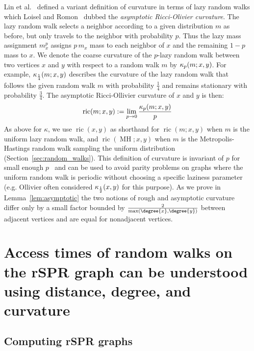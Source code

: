 \documentclass[11pt,onecolumn,conference]{IEEEtran}
\newcommand{\MH}{\operatorname{MH}}
\newcommand{\curvature}[2][]{%
    \ifthenelse{\equal{#1}{}}%
		{\kappa(#2)}%
		{\kappa_{#1}(#2)}%
}
\newcommand{\ric}[1]{
	\operatorname{ric}(#1)%
}
\begin{document}
Lin et al.~\cite{lin2011ricci} defined a variant definition of curvature in terms of lazy random walks which Loisel and Romon~\cite{Loisel2014-hu} dubbed the \emph{asymptotic Ricci-Olivier curvature}.
The lazy random walk selects a neighbor according to a given distribution $m$ as before, but only travels to the neighbor with probability $p$.
Thus the lazy mass assignment $m^p_x$ assigns $p\, m_x$ mass to each neighbor of $x$ and the remaining $1 - p$ mass to $x$.
We denote the coarse curvature of the $p$-lazy random walk between two vertices $x$ and $y$ with respect to a random walk $m$ by $\curvature[p]{m; x,y}$.
For example, $\curvature[\frac{1}{4}]{m; x,y}$ describes the curvature of the lazy random walk that follows the given random walk $m$ with probability $\frac{1}{4}$ and remains stationary with probability $\frac{3}{4}$.
The asymptotic Ricci-Ollivier curvature of $x$ and $y$ is then:
\begin{equation}
\ric{m; x, y} := \lim_{p \rightarrow 0} \frac{\curvature[p]{m; x,y}}{p}
\label{eq:asympCurvatureDef}
\end{equation}
As above for $\kappa$, we use $\ric{x, y}$ as shorthand for $\ric{m; x, y}$ when $m$ is the uniform lazy random walk, and $\ric{\MH; x, y}$ when $m$ is the Metropolis-Hastings random walk sampling the uniform distribution (Section~\ref{sec:random_walks}).
This definition of curvature is invariant of $p$ for small enough $p$~\cite{Loisel2014-hu} and can be used to avoid parity problems on graphs where the uniform random walk is periodic without choosing a specific laziness parameter (e.g. Ollivier often considered $\curvature[\frac{1}{2}]{x,y}$ for this purpose).
As we prove in Lemma~\ref{lem:asymptotic} the two notions of rough and asymptotic curvature differ only by a small factor bounded by $\frac{2}{\max(\degree{x}, \degree{y})}$ between adjacent vertices and are equal for nonadjacent vertices.


\section{Access times of random walks on the rSPR graph can be understood using distance, degree, and curvature}

\subsection{Computing rSPR graphs}
\label{sec:computing_treespace}
\end{document}
